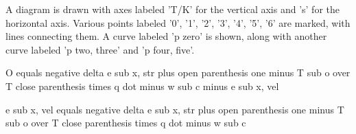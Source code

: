 A diagram is drawn with axes labeled 'T/K' for the vertical axis and 's' for the horizontal axis. Various points labeled '0', '1', '2', '3', '4', '5', '6' are marked, with lines connecting them. A curve labeled 'p zero' is shown, along with another curve labeled 'p two, three' and 'p four, five'.

O equals negative delta e sub x, str plus open parenthesis one minus T sub o over T close parenthesis times q dot minus w sub c minus e sub x, vel

e sub x, vel equals negative delta e sub x, str plus open parenthesis one minus T sub o over T close parenthesis times q dot minus w sub c